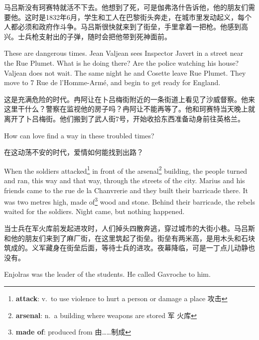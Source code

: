 \documentclass[fontset=ubuntu, zihao=5]{ctexart}
\begin{document}
\begin{paracol}{2}
\switchcolumn

马吕斯没有珂赛特就活不下去。他想到了死，可是伽弗洛什告诉他，他的朋友们需要他。这时是1832年6月，学生和工人在巴黎街头奔走，在城市里发动起义，每个人都必须和政府作斗争。马吕斯很快就来到了街垒，手里拿着一把枪。他感到高兴。士兵枪支射出的子弹，随时会把他带到死神面前。

\switchcolumn*

These are dangerous times. Jean Valjean sees Inspector Javert in a street near the Rue Plumet. What is he doing there? Are the police watching his house? Valjean does not wait. The same night he and Cosette leave Rue Plumet. They move to 7 Rue de l'Homme-Armé, and begin to get ready for England.


\switchcolumn

这是充满危险的时代。冉阿让在卜吕梅街附近的一条街道上看见了沙威督察。他来这里干什么？警察在监视他的房子吗？冉阿让不能再等了。他和珂赛特当天晚上就离开了卜吕梅街。他们搬到了武人街7号，开始收拾东西准备动身前往英格兰。

\switchcolumn*

How can love find a way in these troubled times?

\switchcolumn

在这动荡不安的时代，爱情如何能找到出路？

\switchcolumn*

\sectionbreak

When the soldiers attacked\footnote{\textbf{attack}: v. to use violence to
  hurt a person or damage a place 攻击} in front of the
arsenal\footnote{\textbf{arsenal}: n. a building where weapons are stored 军
  火库} building, the people turned and ran, this way and that way, through
the streets of the city. Marius and his friends came to the rue de la
Chanvrerie and they built their barricade there. It was two metres high,
made of\footnote{\textbf{made of}: produced from 由……制成}
 wood and stone. Behind their barricade, the rebels waited for the
soldiers. Night came, but nothing happened.

\switchcolumn

\sectionbreak

当士兵在军火库前发起进攻时，人们掉头四散奔逃，穿过城市的大街小巷。马吕斯和他的朋友们来到了麻厂街，在这里筑起了街垒。街垒有两米高，是用木头和石块筑成的。义军藏身在街垒后面，等待士兵的进攻。夜幕降临，可是一丁点儿动静也没有。

\switchcolumn*

Enjolras was the leader of the students. He called Gavroche to him.



\end{paracol}
\end{document}
